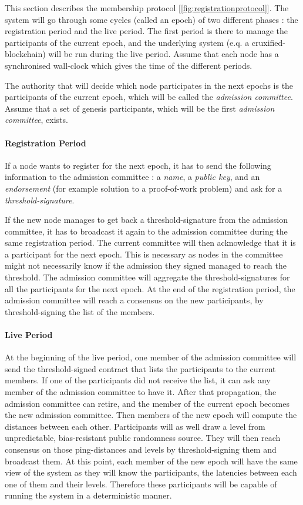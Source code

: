 \documentclass[a4paper,11pt,oneside]{report}
\begin{document}
This section describes the membership protocol [\autoref{fig:registrationprotocol}].
The system will go through some cycles (called an epoch) of two different phases :
the registration period and the live period. The first period is there
to manage the participants of the current epoch, and the underlying system
(e.q. a cruxified-blockchain) will be run during the live period. Assume
that each node has a synchronised wall-clock which gives the time of the
different periods.

The authority that will decide which node participates in the next epochs is
the participants of the current epoch, which will be called the \textit{admission
committee}. Assume that a set of genesis participants, which will be the first
 \textit{admission committee}, exists.

\paragraph{Registration Period}
If a node wants to register for the next epoch, it has to send the following
information to the admission committee : a \textit{name}, a \textit{public key}, and an
 \textit{endorsement} (for example solution to a proof-of-work problem) and ask for a
 \textit{threshold-signature}. 

If the new node manages to get back a threshold-signature from the admission
committee, it has to broadcast it again to the admission committee during the
same registration period. The current committee will then acknowledge that it
is a participant for the next epoch. This is necessary as nodes in the
committee might not necessarily know if the admission they signed managed to
reach the threshold. The admission committee will aggregate the
threshold-signatures for all the participants for the next epoch. At the end of
the registration period, the admission committee will reach a consensus on the
new participants, by threshold-signing the list of the members.  

\paragraph{Live Period}
At the beginning of the live period, one member of the admission committee will
send the threshold-signed contract that lists the participants to the current
members. If one of the participants did not receive the list, it can ask any
member of the admission committee to have it. After that propagation, the
admission committee can retire, and the member of the current epoch becomes the
new admission committee. Then members of the new epoch will compute the
distances between each other. Participants will as well draw a level from
unpredictable, bias-resistant public randomness source. They will then reach
consensus on those ping-distances and levels by threshold-signing them and
broadcast them.  At this point, each member of the new epoch will have the same
view of the system as they will know the participants, the latencies between
each one of them and their levels. Therefore these participants will be capable
of running the system in a deterministic manner.
\end{document}
